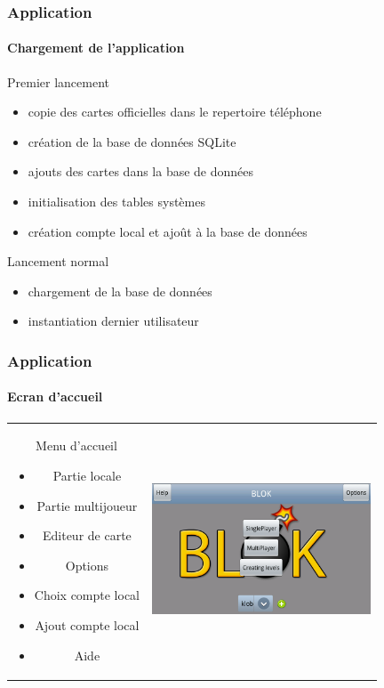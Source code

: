 	\begin{frame}
	\frametitle{Application}
	\framesubtitle{Chargement de l'application}
		\begin{block}{Premier lancement}
			\begin{itemize}
			 	\item copie des cartes officielles dans le repertoire téléphone 
				\item création de la base de données SQLite
				\item ajouts des cartes dans la base de données
				\item initialisation des tables	systèmes
				\item création compte local et ajoût à la base de données
			\end{itemize}
		\end{block}
				
		\begin{block}{Lancement normal}
			\begin{itemize}
				\item chargement de la base de données 
				\item instantiation dernier utilisateur
			\end{itemize}
		\end{block}
	
	\end{frame}
	
	
	\begin{frame}
	\frametitle{Application}
	\framesubtitle{Ecran d'accueil}
		\begin{center}
		\begin{tabular}{cc}
			\begin{minipage}{4cm}
		
				Menu d'accueil
				\begin{itemize}
					\item Partie locale
					\item Partie multijoueur
					\item Editeur de carte
					\item Options
					\item Choix compte local
					\item Ajout compte local
					\item Aide
				\end{itemize}
			\end{minipage}  &		
			\begin{minipage}{8cm}
				\includegraphics[width=6.5cm]{img/2.png} 
			\end{minipage}\\
		\end{tabular}
		\end{center}
	
	\end{frame}
	
